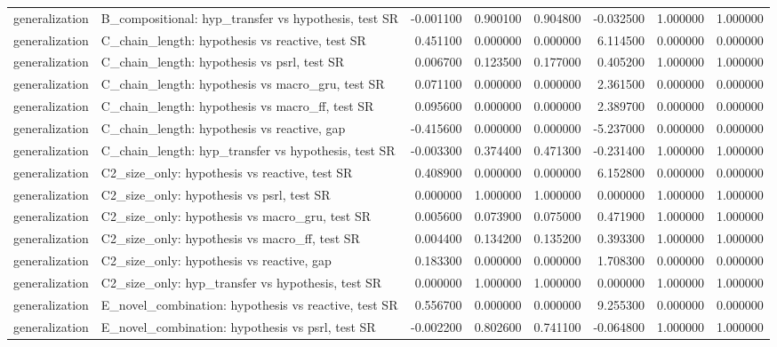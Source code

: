 \begin{tabular}{llrrrrrr}
generalization & B\_compositional: hyp\_transfer vs hypothesis, test SR & -0.001100 & 0.900100 & 0.904800 & -0.032500 & 1.000000 & 1.000000 \\
generalization & C\_chain\_length: hypothesis vs reactive, test SR & 0.451100 & 0.000000 & 0.000000 & 6.114500 & 0.000000 & 0.000000 \\
generalization & C\_chain\_length: hypothesis vs psrl, test SR & 0.006700 & 0.123500 & 0.177000 & 0.405200 & 1.000000 & 1.000000 \\
generalization & C\_chain\_length: hypothesis vs macro\_gru, test SR & 0.071100 & 0.000000 & 0.000000 & 2.361500 & 0.000000 & 0.000000 \\
generalization & C\_chain\_length: hypothesis vs macro\_ff, test SR & 0.095600 & 0.000000 & 0.000000 & 2.389700 & 0.000000 & 0.000000 \\
generalization & C\_chain\_length: hypothesis vs reactive, gap & -0.415600 & 0.000000 & 0.000000 & -5.237000 & 0.000000 & 0.000000 \\
generalization & C\_chain\_length: hyp\_transfer vs hypothesis, test SR & -0.003300 & 0.374400 & 0.471300 & -0.231400 & 1.000000 & 1.000000 \\
generalization & C2\_size\_only: hypothesis vs reactive, test SR & 0.408900 & 0.000000 & 0.000000 & 6.152800 & 0.000000 & 0.000000 \\
generalization & C2\_size\_only: hypothesis vs psrl, test SR & 0.000000 & 1.000000 & 1.000000 & 0.000000 & 1.000000 & 1.000000 \\
generalization & C2\_size\_only: hypothesis vs macro\_gru, test SR & 0.005600 & 0.073900 & 0.075000 & 0.471900 & 1.000000 & 1.000000 \\
generalization & C2\_size\_only: hypothesis vs macro\_ff, test SR & 0.004400 & 0.134200 & 0.135200 & 0.393300 & 1.000000 & 1.000000 \\
generalization & C2\_size\_only: hypothesis vs reactive, gap & 0.183300 & 0.000000 & 0.000000 & 1.708300 & 0.000000 & 0.000000 \\
generalization & C2\_size\_only: hyp\_transfer vs hypothesis, test SR & 0.000000 & 1.000000 & 1.000000 & 0.000000 & 1.000000 & 1.000000 \\
generalization & E\_novel\_combination: hypothesis vs reactive, test SR & 0.556700 & 0.000000 & 0.000000 & 9.255300 & 0.000000 & 0.000000 \\
generalization & E\_novel\_combination: hypothesis vs psrl, test SR & -0.002200 & 0.802600 & 0.741100 & -0.064800 & 1.000000 & 1.000000 \\

\end{tabular}

